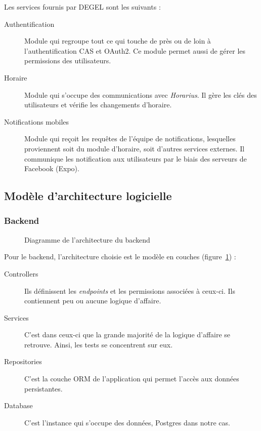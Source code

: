     \noindent Les services fournis par DEGEL sont les suivants :
    \begin{description}
        \item[Authentification] Module qui regroupe tout ce qui touche de près ou de loin à l'authentification CAS et OAuth2. Ce module permet aussi de gérer les permissions des utilisateurs.
        \item[Horaire] Module qui s'occupe des communications avec \emph{Horarius}. Il gère les clés des utilisateurs et vérifie les changements d'horaire.
        \item[Notifications mobiles] Module qui reçoit les requêtes de l'équipe de notifications, lesquelles proviennent soit du module d'horaire, soit d'autres services externes. Il communique les notification aux utilisateurs par le biais des serveurs de Facebook (Expo).
    \end{description}

    \subsection{Modèle d'architecture logicielle}
        \subsubsection{Backend}
        \begin{figure}[p] \centering
            
            \caption{Diagramme de l'architecture du backend}
            \label{fig.architectureBackend}
        \end{figure}
        
        \noindent Pour le backend, l'architecture choisie est le modèle en couches (figure~\ref{fig.architectureBackend}) :
        \begin{description}
            \item[Controllers] Ils définissent les \emph{endpoints} et les permissions associées à ceux-ci. Ils contiennent peu ou aucune logique d'affaire.
            \item[Services] C'est dans ceux-ci que la grande majorité de la logique d'affaire se retrouve. Ainsi, les tests se concentrent sur eux.
            \item[Repositories] C'est la couche ORM de l'application qui permet l'accès aux données persistantes.
            \item[Database] C'est l'instance qui s'occupe des données, Postgres dans notre cas.
        \end{description}

